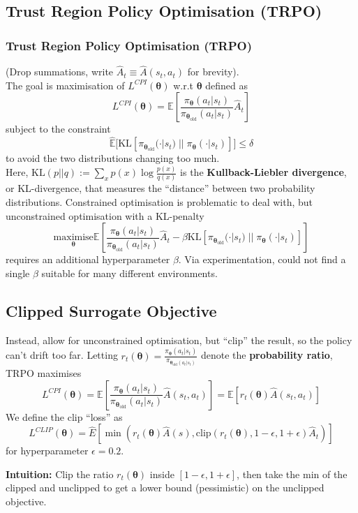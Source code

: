 \documentclass[10pt,a4paper, handout]{beamer}
\newcommand{\bth}{{\boldsymbol{\theta}}}
\newcommand{\Ex}{\mathbb{E}}
\begin{document}
\subsection{Trust Region Policy Optimisation (TRPO)}
\begin{frame}
	\frametitle{Trust Region Policy Optimisation (TRPO)}
	(Drop summations, write $\hat{A}_t \equiv \hat{A}(s_t,a_t)$ for brevity).\\
	The goal is maximisation of $L^{CPI}(\bth)$ w.r.t $\bth$ defined as
	$$
	L^{CPI}(\bth) = \Ex \left[ 
	\frac{\pi_\bth(a_t | s_t)}{\pi_{\bth_\text{old}}(a_t | s_t)} \hat{A}_t \right]
	$$
	subject to the constraint 
	$$
	\hat{\Ex} \bigg[ \text{KL}[\pi_{\bth_\text{old}}(\cdot | s_t)\; ||\; 
	\pi_\bth(\cdot | s_t)] \bigg] \leq \delta 
	$$
	to avoid the two distributions changing too much. \\
	\pause
	Here, $\text{KL}(p||q) := \sum_x p(x) \log \frac{p(x)}{q(x)}$ is the 
	\textbf{Kullback-Liebler divergence}, or KL-divergence, that measures
	the ``distance'' between two probability distributions.
	\pause
	Constrained optimisation is problematic to deal with, but unconstrained
	optimisation with a KL-penalty
	$$
	\underset{\bth}{\text{maximise}}
	\Ex \left[ \frac{\pi_\bth(a_t | s_t)}{\pi_{\bth_\text{old}}(a_t | s_t)} 
	\hat{A}_t - \beta \text{KL}[\pi_{\bth_\text{old}}(\cdot | s_t)\; ||\; 
	\pi_\bth(\cdot | s_t)]  \right]
	$$
	requires an additional hyperparameter $\beta$. Via experimentation, could not find
	a single $\beta$ suitable for many different environments.
\end{frame}

\subsection{Clipped Surrogate Objective}
\begin{frame}
	Instead, allow for unconstrained optimisation, but ``clip'' the result, so the
	policy can't drift too far.
	\pause
	Letting $r_t(\bth) = \frac{\pi_\bth(a_t | s_t)}{\pi_{\bth_{\text{old}}(a_t|s_t)}}$
	denote the \textbf{probability ratio}, TRPO maximises 
	$$
	L^{CPI}(\bth) = \Ex \left[ \frac{\pi_\bth(a_t | s_t)}{\pi_{\bth_\text{old}}(a_t | s_t)} \hat{A}(s_t, a_t) \right]
	= \Ex \left[ r_t(\bth) \hat{A}(s_t, a_t) \right]
	$$
	\pause
	We define the clip ``loss'' as
	$$
	L^{CLIP}(\bth) = \hat{E}
	\left[
	\min(r_t(\bth) \hat{A}(s), 
	\text{clip}(r_t(\bth), 1-\epsilon, 1+\epsilon) \hat{A}_t )
	\right]
	$$
	for hyperparameter $\epsilon = 0.2$.
	\pause 
	
	\textbf{Intuition:} Clip the ratio $r_t(\bth)$ inside $[1-\epsilon,1+\epsilon]$,
	then take the min of the clipped and unclipped to get a lower bound (pessimistic)
	on the unclipped objective.
\end{frame}
\end{document}
